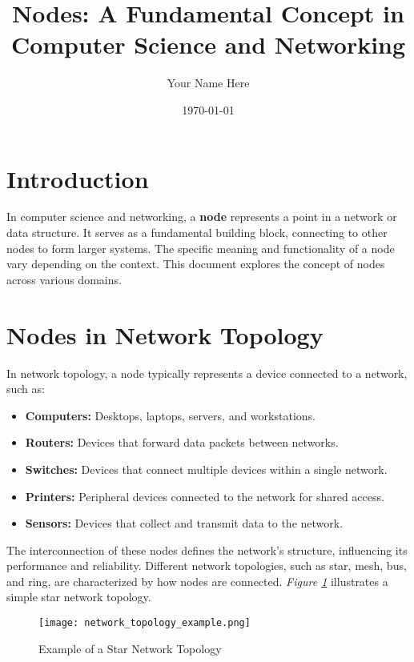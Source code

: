 \documentclass{article}
\title{Nodes: A Fundamental Concept in Computer Science and Networking}
\author{Your Name Here}
\date{\today}
\begin{document}
\maketitle

\section{Introduction}

In computer science and networking, a \textbf{node} represents a point in a network or data structure.  It serves as a fundamental building block, connecting to other nodes to form larger systems. The specific meaning and functionality of a node vary depending on the context.  This document explores the concept of nodes across various domains.

\section{Nodes in Network Topology}

In network topology, a node typically represents a device connected to a network, such as:

\begin{itemize}
    \item \textbf{Computers:} Desktops, laptops, servers, and workstations.
    \item \textbf{Routers:} Devices that forward data packets between networks.
    \item \textbf{Switches:} Devices that connect multiple devices within a single network.
    \item \textbf{Printers:} Peripheral devices connected to the network for shared access.
    \item \textbf{Sensors:} Devices that collect and transmit data to the network.
\end{itemize}

The interconnection of these nodes defines the network's structure, influencing its performance and reliability.  Different network topologies, such as star, mesh, bus, and ring, are characterized by how nodes are connected.  \textit{Figure \ref{fig:network_topology}} illustrates a simple star network topology.

\begin{figure}[h]
    \centering
    \texttt{[image: network\_topology\_example.png]} %
    \caption{Example of a Star Network Topology}
    \label{fig:network_topology}
\end{figure}
\end{document}
